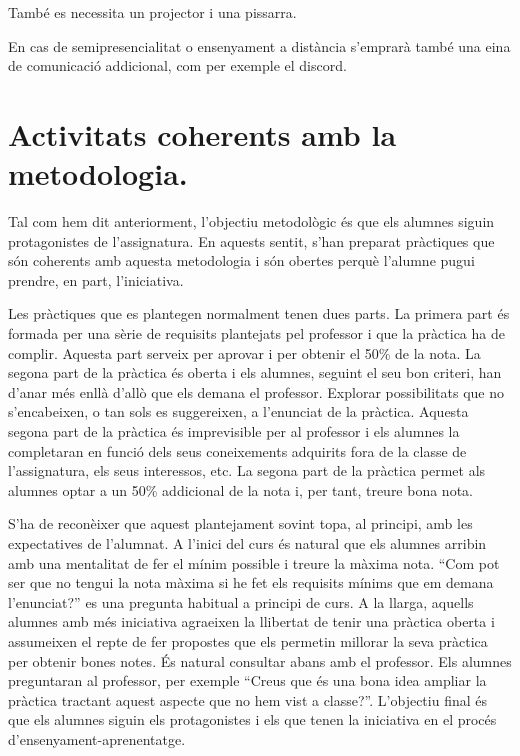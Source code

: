 \documentclass[catalan, a4paper, 12pt, titlepage]{article}
\begin{document}
També es necessita un projector i una pissarra.

En cas de semipresencialitat o ensenyament a distància s'emprarà també una eina de comunicació addicional, com per exemple el discord.

\section{Activitats coherents amb la metodologia.}
\label{sec:activitats_coherents}

Tal com hem dit anteriorment, l'objectiu metodològic és que els alumnes siguin protagonistes de l'assignatura.
En aquests sentit, s'han preparat pràctiques que són coherents amb aquesta metodologia i són obertes perquè l'alumne pugui prendre, en part, l'iniciativa.

Les pràctiques que es plantegen normalment tenen dues parts.
La primera part és formada per una sèrie de requisits plantejats pel professor i que la pràctica ha de complir. 
Aquesta part serveix per aprovar i per obtenir el 50\% de la nota.
La segona part de la pràctica és oberta i els alumnes, seguint el seu bon criteri, han d'anar més enllà d'allò que els demana el professor.
Explorar possibilitats que no s'encabeixen, o tan sols es suggereixen, a l'enunciat de la pràctica.
Aquesta segona part de la pràctica és imprevisible per al professor i els alumnes la completaran en funció dels seus coneixements adquirits fora de la classe de l'assignatura, els seus interessos, etc.
La segona part de la pràctica permet als alumnes optar a un 50\% addicional de la nota i, per tant, treure bona nota.

S'ha de reconèixer que aquest plantejament sovint topa, al principi, amb les expectatives de l'alumnat.
A l'inici del curs és natural que els alumnes arribin amb una mentalitat de fer el mínim possible i treure la màxima nota.
``Com pot ser que no tengui la nota màxima si he fet els requisits mínims que em demana l'enunciat?'' es una pregunta habitual a principi de curs.
A la llarga, aquells alumnes amb més iniciativa agraeixen la llibertat de tenir una pràctica oberta i assumeixen el repte de fer propostes que els permetin millorar la seva pràctica per obtenir bones notes.
És natural consultar abans amb el professor. 
Els alumnes preguntaran al professor, per exemple ``Creus que és una bona idea ampliar la pràctica tractant aquest aspecte que no hem vist a classe?''.
L'objectiu final és que els alumnes siguin els protagonistes i els que tenen la iniciativa en el procés d'ensenyament-aprenentatge.
\end{document}
